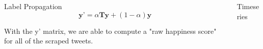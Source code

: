 \documentclass[final]{beamer}
\newlength{\onecolwid}
\newlength{\twocolwid}
\begin{document}
\begin{frame}[t]
\begin{columns}[t]
\begin{column}{\twocolwid}
\begin{columns}[t,totalwidth=\twocolwid]
\begin{column}{\onecolwid}
\begin{block}{Label Propagation}
\begin{equation}
\textbf{y'} = \alpha \textbf{Ty} + (1-\alpha)\textbf{y}
\end{equation}

With the y' matrix, we are able to compute a "raw happiness score" for all of the scraped tweets.

\end{block}




\end{column} %

\begin{column}{\onecolwid}\vspace{-.6in} %


\begin{block}{Timeseries}

\end{block}






\end{column}
\end{columns}
\end{column}
\end{columns}
\end{frame}
\end{document}
